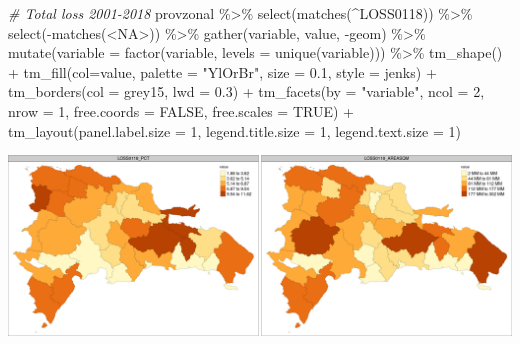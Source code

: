 \documentclass[10pt,landscape,a3paper]{article}
\newenvironment{Shaded}{\begin{snugshade}}{\end{snugshade}}
\newcommand{\AttributeTok}[1]{\textcolor[rgb]{0.77,0.63,0.00}{#1}}
\newcommand{\CommentTok}[1]{\textcolor[rgb]{0.56,0.35,0.01}{\textit{#1}}}
\newcommand{\ConstantTok}[1]{\textcolor[rgb]{0.00,0.00,0.00}{#1}}
\newcommand{\DecValTok}[1]{\textcolor[rgb]{0.00,0.00,0.81}{#1}}
\newcommand{\FloatTok}[1]{\textcolor[rgb]{0.00,0.00,0.81}{#1}}
\newcommand{\FunctionTok}[1]{\textcolor[rgb]{0.00,0.00,0.00}{#1}}
\newcommand{\NormalTok}[1]{#1}
\newcommand{\SpecialCharTok}[1]{\textcolor[rgb]{0.00,0.00,0.00}{#1}}
\newcommand{\StringTok}[1]{\textcolor[rgb]{0.31,0.60,0.02}{#1}}
\begin{document}
\begin{Shaded}
\begin{Highlighting}[]

\CommentTok{\# Total loss 2001{-}2018}
\NormalTok{provzonal }\SpecialCharTok{\%\textgreater{}\%} \FunctionTok{select}\NormalTok{(}\FunctionTok{matches}\NormalTok{(}\StringTok{\textquotesingle{}\^{}LOSS0118\textquotesingle{}}\NormalTok{)) }\SpecialCharTok{\%\textgreater{}\%} \FunctionTok{select}\NormalTok{(}\SpecialCharTok{{-}}\FunctionTok{matches}\NormalTok{(}\StringTok{\textquotesingle{}\textless{}NA\textgreater{}\textquotesingle{}}\NormalTok{)) }\SpecialCharTok{\%\textgreater{}\%} 
  \FunctionTok{gather}\NormalTok{(variable, value, }\SpecialCharTok{{-}}\NormalTok{geom) }\SpecialCharTok{\%\textgreater{}\%}
  \FunctionTok{mutate}\NormalTok{(}\AttributeTok{variable =} \FunctionTok{factor}\NormalTok{(variable, }\AttributeTok{levels =} \FunctionTok{unique}\NormalTok{(variable))) }\SpecialCharTok{\%\textgreater{}\%} 
  \FunctionTok{tm\_shape}\NormalTok{() }\SpecialCharTok{+}
    \FunctionTok{tm\_fill}\NormalTok{(}\AttributeTok{col=}\StringTok{\textquotesingle{}value\textquotesingle{}}\NormalTok{, }\AttributeTok{palette =} \StringTok{"YlOrBr"}\NormalTok{, }\AttributeTok{size =} \FloatTok{0.1}\NormalTok{, }\AttributeTok{style =} \StringTok{\textquotesingle{}jenks\textquotesingle{}}\NormalTok{) }\SpecialCharTok{+}
    \FunctionTok{tm\_borders}\NormalTok{(}\AttributeTok{col =} \StringTok{\textquotesingle{}grey15\textquotesingle{}}\NormalTok{, }\AttributeTok{lwd =} \FloatTok{0.3}\NormalTok{) }\SpecialCharTok{+}
    \FunctionTok{tm\_facets}\NormalTok{(}\AttributeTok{by =} \StringTok{"variable"}\NormalTok{, }\AttributeTok{ncol =} \DecValTok{2}\NormalTok{, }\AttributeTok{nrow =} \DecValTok{1}\NormalTok{, }\AttributeTok{free.coords =} \ConstantTok{FALSE}\NormalTok{, }\AttributeTok{free.scales =} \ConstantTok{TRUE}\NormalTok{) }\SpecialCharTok{+}
    \FunctionTok{tm\_layout}\NormalTok{(}\AttributeTok{panel.label.size =} \DecValTok{1}\NormalTok{, }\AttributeTok{legend.title.size =} \DecValTok{1}\NormalTok{, }\AttributeTok{legend.text.size =} \DecValTok{1}\NormalTok{)}
\end{Highlighting}
\end{Shaded}

\begin{center}\includegraphics{img/data-download-preparation-eda/zonal-prov-4} \end{center}
\end{document}
